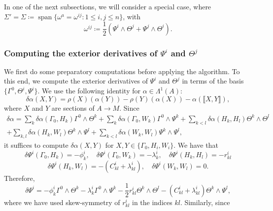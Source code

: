 \documentclass[11pt]{article}
\theoremstyle{plain}
\theoremstyle{definition}
\DeclareMathOperator\spn{span} %
\begin{document}
In one of the next subsections, we will consider a special case, where $\Sigma'=\Sigma\coloneqq \spn\{\omega^a= \omega^{ij}\colon 1\leq i,j\leq n\}$, with
\begin{equation*}
    \omega^{ij}\coloneqq \frac{1}{2}\left(\Psi^i\wedge \Theta^j+\Psi^j\wedge \Theta^i\right).
\end{equation*}

\subsubsection{\texorpdfstring{Computing the exterior derivatives of $\Psi^i$ and $\Theta^j$}{Computing the exterior derivatives of Psii and Thetaj}}

We first do some preparatory computations before applying the algorithm. To this end, we compute the exterior derivatives of $\Psi^i$ and $\Theta^j$ in terms of the basis $\{\Gamma^0,\Theta^i,\Psi^i\}$. We use the following identity for $\alpha\in \Lambda^1(A)$:
\begin{equation*}
    \delta \alpha(X,Y)=\rho(X)(\alpha(Y))-\rho(Y)(\alpha(X))-\alpha(\llbracket X,Y\rrbracket),
\end{equation*}
where $X$ and $Y$ are sections of $A\to M$. Since
\begin{multline*}
    \delta \alpha=\sum_k \delta \alpha(\Gamma_0,H_k)\Gamma^0\wedge \Theta^k+\sum_k \delta \alpha(\Gamma_0,W_k)\Gamma^0\wedge \Psi^k+\sum_{k<l} \delta\alpha(H_k,H_l)\Theta^k\wedge \Theta^l\\+\sum_{k,l} \delta \alpha(H_k,W_l)\Theta^k\wedge \Psi^l+\sum_{k<l} \delta \alpha(W_k,W_l)\Psi^k\wedge \Psi^l,
\end{multline*}
it suffices to compute $\delta \alpha(X,Y)$ for $X,Y\in \{\Gamma_0,H_i,W_i\}$. We have that
\begin{equation*}
    \delta \Psi^i(\Gamma_0,H_k)=-\phi_k^i,\quad \delta\Psi^i(\Gamma_0,W_k)=-\lambda_k^i,\quad \delta \Psi^i(H_k,H_l)=-r_{kl}^i
\end{equation*}
\begin{equation*}
    \delta\Psi^i(H_k,W_l)=-(C_{kl}^i+\lambda_{kl}^i),\quad \delta\Psi^i(W_k,W_l)=0.
\end{equation*}
Therefore,
\begin{equation}\label{eqn:dpsii}
    \delta \Psi^i=-\phi_k^i \Gamma^0\wedge \Theta^k-\lambda_k^i \Gamma^0\wedge \Psi^k-\frac{1}{2}r_{kl}^i \Theta^k\wedge \Theta^l-(C_{kl}^i+\lambda_{kl}^i) \Theta^k\wedge \Psi^l,
\end{equation}
where we have used skew-symmetry of $r_{kl}^i$ in the indices $kl$. Similarly, since
\end{document}
